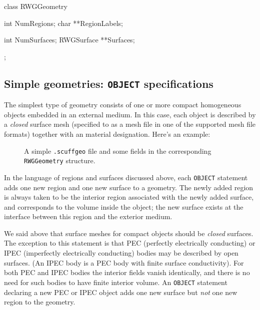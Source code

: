 \medskip

\begin{verbcode}
  class RWGGeometry
   {
      int NumRegions;
      char **RegionLabels;

      int NumSurfaces;
      RWGSurface **Surfaces;
   };
\end{verbcode}

\subsection*{Simple geometries: \texttt{OBJECT} specifications}

The simplest type of \lss geometry consists of one or more
compact homogeneous objects embedded in an external 
medium. In this case, each object is described by a 
\textit{closed} surface mesh (specified to \lss
as a mesh file in one of the supported mesh file 
formats) together with an material designation.
Here's an example:
\begin{figure}[H]
\begin{center}
\caption{A simple \texttt{.scuffgeo} file and some fields in the 
         corresponding \texttt{RWGGeometry} structure.}
\end{center}
\end{figure}

In the language of regions and surfaces discussed above,
each \texttt{OBJECT} statement adds one new region and 
one new surface to a geometry. The newly added region 
is always taken to be the interior region associated
with the newly added surface, and corresponds to the
volume inside the object; the new surface exists at 
the interface between this region and the exterior
medium.

We said above that surface meshes for compact objects 
should be \textit{closed} surfaces. The exception to 
this statement is that PEC (perfectly electrically
conducting) or IPEC (imperfectly electrically 
conducting) bodies may be described by open surfaces.
(An IPEC body is a PEC body with finite surface 
conductivity). For both PEC and IPEC bodies the
interior fields vanish identically, and there
is no need for such bodies to have finite
interior volume. An \texttt{OBJECT} statement 
declaring a new PEC or IPEC object adds one new surface
but \textit{not} one new region to the geometry.


